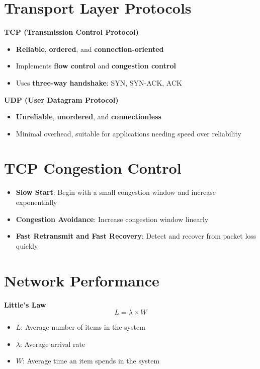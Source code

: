 \documentclass[9pt]{extarticle}
\begin{document}
\begin{multicols*}{3}
{\color{sectioncolor}\section*{\centering Transport Layer Protocols}}
\textbf{TCP (Transmission Control Protocol)}
\begin{itemize}
    \item \textbf{Reliable}, \textbf{ordered}, and \textbf{connection-oriented}
    \item Implements \textbf{flow control} and \textbf{congestion control}
    \item Uses \textbf{three-way handshake}: SYN, SYN-ACK, ACK
\end{itemize}

\textbf{UDP (User Datagram Protocol)}
\begin{itemize}
    \item \textbf{Unreliable}, \textbf{unordered}, and \textbf{connectionless}
    \item Minimal overhead, suitable for applications needing speed over reliability
\end{itemize}

{\color{sectioncolor}\section*{\centering TCP Congestion Control}}
\begin{itemize}
    \item \textbf{Slow Start}: Begin with a small congestion window and increase exponentially
    \item \textbf{Congestion Avoidance}: Increase congestion window linearly
    \item \textbf{Fast Retransmit and Fast Recovery}: Detect and recover from packet loss quickly
\end{itemize}

{\color{sectioncolor}\section*{\centering Network Performance}}
\textbf{Little's Law}
\[
L = \lambda \times W
\]
\begin{itemize}
    \item \( L \): Average number of items in the system
    \item \( \lambda \): Average arrival rate
    \item \( W \): Average time an item spends in the system
\end{itemize}


\end{multicols*}
\end{document}
